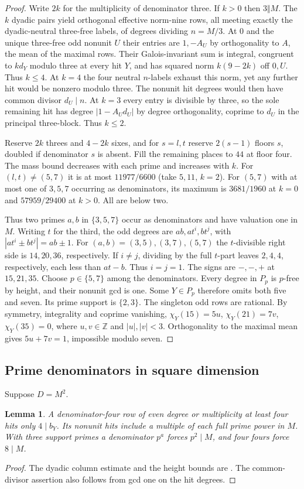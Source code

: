 \documentclass[11pt]{amsart}
\numberwithin{equation}{section}
\newtheorem{lemma}[theorem]{Lemma}
\theoremstyle{definition}
\theoremstyle{plain}
\newcommand{\ZZ}{\mathbb Z}
\begin{document}
\begin{proof}
Write $2k$ for the multiplicity of denominator three. If $k>0$ then
$3\Vert M$. The $k$ dyadic pairs yield orthogonal effective norm-nine
rows, all meeting exactly the dyadic-neutral three-free labels, of
degrees dividing $n=M/3$. At $0$ and the unique three-free odd
nonunit $U$ their entries are $1,-A_U$ by orthogonality to $A$,
the mean of the maximal rows. Their Galois-invariant sum is integral,
congruent to $k d_Y$ modulo three at every hit $Y$, and has squared
norm $k(9-2k)$ off $0,U$. Thus $k\le4$. At $k=4$ the four neutral
$n$-labels exhaust this norm, yet any further hit would be nonzero
modulo three. The nonunit hit degrees would then have common divisor
$d_U\mid n$. At $k=3$ every entry is divisible by three, so the
sole remaining hit has degree $|1-A_Ud_U|$ by degree orthogonality,
coprime to $d_U$ in the principal three-block. Thus $k\le2$.

Reserve $2k$ threes and $4-2k$ sixes, and for $s=l,t$ reserve
$2(s-1)$ floors $s$, doubled if denominator $s$ is absent. Fill
the remaining places to $44$ at floor four. The mass bound decreases
with each prime and increases with $k$. For $(l,t)\ne(5,7)$ it is
at most $11977/6600$ (take $5,11$, $k=2$). For $(5,7)$ with at
most one of $3,5,7$ occurring as denominators, its maximum is
$3681/1960$ at $k=0$ and $57959/29400$ at $k>0$. All are below two.

Thus two primes $a,b$ in $\{3,5,7\}$ occur as denominators and
have valuation one in $M$. Writing $t$ for the third, the odd
degrees are $ab,at^i,bt^j$, with $|at^i\pm bt^j|=ab\pm1$.
For $(a,b)=(3,5),(3,7),(5,7)$ the $t$-divisible right side is
$14,20,36$, respectively. If $i\ne j$, dividing by the full $t$-part
leaves $2,4,4$, respectively, each less than $at-b$. Thus $i=j=1$. The signs are $-,-,+$ at $15,21,35$.
Choose $p\in\{5,7\}$ among the denominators. Every degree in $P_p$
is $p$-free by height, and their nonunit gcd is one. Some $Y\in P_p$
therefore omits both five and seven. Its prime support is $\{2,3\}$.
The singleton odd rows are rational. By symmetry, integrality and
coprime vanishing, $\chi_Y(15)=5u$, $\chi_Y(21)=7v$, $\chi_Y(35)=0$,
where $u,v\in\ZZ$ and $|u|,|v|<3$. Orthogonality to the maximal
mean gives $5u+7v=1$, impossible modulo seven.
\end{proof}

\subsection{Prime denominators in square dimension}
Suppose $D=M^2$.
\begin{lemma}
A denominator-four row of even degree or multiplicity at least four
hits only $4\mid b_Y$. Its nonunit hits include a multiple of each
full prime power in $M$. With three support primes a denominator
$p^a$ forces $p^2\mid M$, and four fours force $8\mid M$.
\end{lemma}
\begin{proof}
The dyadic column estimate and the height bounds are
\cite[\S21.2 and Lemma~21.6]{BDPcore}. The common-divisor assertion
also follows from gcd one on the hit degrees.
\end{proof}
\end{document}
